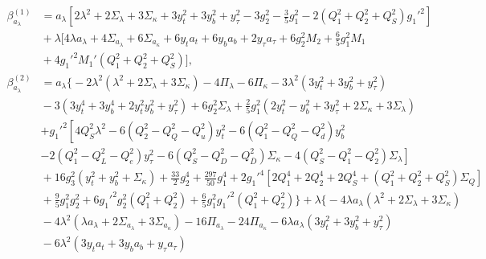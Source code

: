 \documentclass[preprint,amsmath,amssymb,aps,superscriptaddress,prd,
showpacs,floatfix,nofootinbib]{revtex4-1}
\begin{document}
\begin{subequations}
\begin{align}
\beta_{a_\lambda}^{(1)} &= a_\lambda \left [ 2 \lambda ^2 + 2 \Sigma_\lambda +
3 \Sigma_\kappa + 3 y_t^2 + 3 y_b^2 + y_{\tau }^2 - 3 g_2^2 -
\frac{3}{5} g_1^2 - 2 \left ( Q_1^2 + Q_2^2 + Q_S^2 \right ) g_1'^2 \right ]
\nonumber \\
& {} + \lambda \bigg [ 4 \lambda a_\lambda + 4 \Sigma_{a_\lambda} +
6 \Sigma_{a_\kappa} + 6 y_t a_t + 6 y_b a_b + 2 y_\tau a_\tau + 6 g_2^2 M_2 +
\frac{6}{5} g_1^2 M_1 \nonumber \\
& {} + 4 g_1'^2 M_1' \left ( Q_1^2 + Q_2^2 + Q_S^2 \right ) \bigg ] ,
\label{eq:USSMTLambdaBetaOneLoop} \\
\beta_{a_\lambda}^{(2)} &= a_\lambda \bigg \{ -2 \lambda^2 \left ( \lambda^2
+ 2 \Sigma_\lambda + 3 \Sigma_\kappa \right ) - 4 \Pi_\lambda - 6 \Pi_\kappa
- 3 \lambda^2 \left ( 3 y_t^2 + 3 y_b^2 + y_\tau^2 \right ) \nonumber \\
& {} - 3 \left ( 3 y_t^4 + 3 y_b^4 + 2 y_t^2 y_b^2 + y_\tau^2 \right ) +
6 g_2^2 \Sigma_\lambda + \frac{2}{5} g_1^2 \left ( 2 y_t^2 - y_b^2 +
3 y_\tau^2 + 2 \Sigma_\kappa + 3 \Sigma_\lambda \right ) \nonumber \\
& {} \left . + g_1'^2 \left [ 4 Q_S^2 \lambda^2 - 6 \left ( Q_2^2 - Q_Q^2 -
Q_u^2 \right ) y_t^2 - 6 \left ( Q_1^2 - Q_Q^2 - Q_d^2 \right ) y_b^2 \right .
\right . \nonumber \\
& {} \left . - 2 \left ( Q_1^2 - Q_L^2 - Q_e^2 \right ) y_\tau^2 -
6 \left ( Q_S^2 - Q_D^2 - Q_{\overline{D}}^2 \right ) \Sigma_\kappa -
4 \left ( Q_S^2 - Q_1^2 - Q_2^2 \right ) \Sigma_\lambda \right ] \nonumber \\
& {} + 16 g_3^2 \left ( y_t^2 + y_b^2 + \Sigma_\kappa \right ) +
\frac{33}{2} g_2^4 + \frac{297}{50} g_1^4 + 2 g_1'^4 \left [ 2 Q_1^4 +
2 Q_2^4 + 2 Q_S^4 + \left ( Q_1^2 + Q_2^2 + Q_S^2 \right ) \Sigma_{Q} \right ]
\nonumber \\
& {} + \frac{9}{5} g_1^2 g_2^2 +6 g_1'^2 g_2^2 \left ( Q_1^2 + Q_2^2 \right )
+ \frac{6}{5} g_1^2 g_1'^2 \left ( Q_1^2 + Q_2^2 \right ) \bigg \} +
\lambda \bigg \{ -4 \lambda a_\lambda \left ( \lambda^2 + 2 \Sigma_\lambda +
3 \Sigma_\kappa \right ) \nonumber \\
& {} - 4 \lambda^2 \left ( \lambda a_\lambda + 2 \Sigma_{a_\lambda} +
3 \Sigma_{a_\kappa} \right ) - 16 \Pi_{a_\lambda} - 24 \Pi_{a_\kappa} -
6 \lambda a_\lambda \left ( 3 y_t^2 + 3 y_b^2 + y_\tau^2 \right ) \nonumber \\
& {} - 6 \lambda^2 \left ( 3 y_t a_t + 3 y_b a_b + y_\tau a_\tau \right )

\end{align}
\end{subequations}
\end{document}
